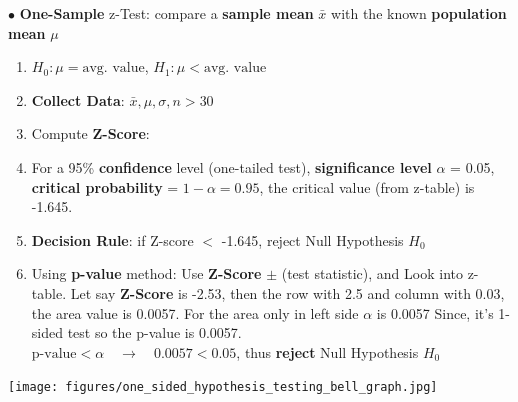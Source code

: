 \documentclass[letterpaper, 10.5pt,landscape]{article}
\begin{document}
\begin{multicols*}{3}
$\bullet$ \textbf{One-Sample} z-Test: compare a \textbf{sample mean} $\bar{x}$ with the  known \textbf{population mean} $\mu$
\vspace{-2pt}
\begin{enumerate}
    \item \(H_{0}: \mu = \text{avg. value}\), \quad \(H_{1}: \mu < \text{avg. value}\)
    \vspace{-2pt}
    \item \textbf{Collect Data}: \(\bar{x}, \mu, \sigma, n > 30 \)
    \vspace{-2pt}
    \item Compute \textbf{Z-Score}: 
    \vspace{-2pt}
    \item For a 95\% \textbf{confidence} level (one-tailed test), \textbf{significance level} $\alpha$ = 0.05, \textbf{critical probability} = \(1-\alpha = 0.95\), the critical value (from z-table) is -1.645. 
    \vspace{-2pt}
    \item \textbf{Decision Rule}: if Z-score $<$ -1.645, reject Null Hypothesis $H_{0}$
    \vspace{-2pt}

    \item Using \textbf{p-value} method: Use \textbf{Z-Score} $\pm$ (test statistic), and Look into z-table. Let say \textbf{Z-Score} is -2.53, then the row with 2.5 and column with 0.03, the area value is 0.0057.
    For the area only in left side $\alpha$ is 0.0057 Since, it's 1-sided test so the p-value is 0.0057. \\
    \(\text{p-value} < \alpha \quad \rightarrow \quad 0.0057 < 0.05\), thus \textbf{reject} Null Hypothesis $H_{0}$
\end{enumerate}
\vspace{-4pt}
\begin{center}
    \begin{minipage}{0.5\linewidth}
    \texttt{[image: figures/one\_sided\_hypothesis\_testing\_bell\_graph.jpg]}
    \end{minipage}
\end{center}
\vspace{-4pt}






\end{multicols*}
\end{document}

